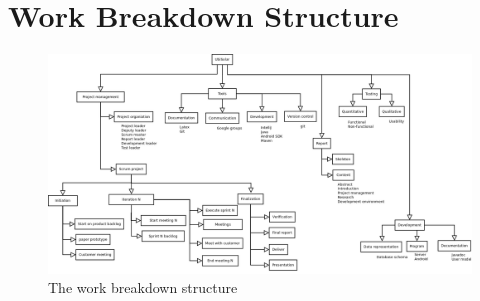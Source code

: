 \section{Work Breakdown Structure}

\begin{figure}[H]
\includegraphics[width=\textwidth]{ch/projectPlan/fig/WBS.png}
\caption{The work breakdown structure}
\end{figure}